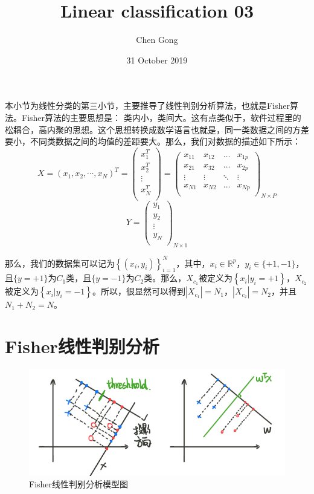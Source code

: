 \documentclass[a4paper]{article}
\title{Linear classification 03}
\author{Chen Gong}
\date{31 October 2019}
\begin{document}
\maketitle
本小节为线性分类的第三小节，主要推导了线性判别分析算法，也就是Fisher算法。Fisher算法的主要思想是：{\color{red} 类内小，类间大。}这有点类似于，软件过程里的松耦合，高内聚的思想。这个思想转换成数学语言也就是，同一类数据之间的方差要小，不同类数据之间的均值的差距要大。那么，我们对数据的描述如下所示：
\begin{equation}
    X=(x_1, x_2, \cdots, x_N)^T=
    \begin{pmatrix}
    x_1^T \\ 
    x_2^T \\
    \vdots\\
    x_N^T \\
    \end{pmatrix} =
    \begin{pmatrix}
    x_{11} & x_{12} & \dots & x_{1p}\\
    x_{21} & x_{32} & \dots & x_{2p}\\
    \vdots & \vdots & \ddots & \vdots\\
    x_{N1} & x_{N2} & \dots & x_{Np}\\
    \end{pmatrix}_{N\times P}
\end{equation}
\begin{equation}
    Y=
    \begin{pmatrix}
    y_1 \\ 
    y_2 \\
    \vdots\\
    y_N \\
    \end{pmatrix}_{N\times 1}
\end{equation}

那么，我们的数据集可以记为$\left\{ (x_i,y_i) \right\}_{i=1}^N$，其中，$x_i \in \mathbb{R}^p$，$y_i\in\{+1,-1\}$，且$\{y=+1\}$为$C_1$类，且$\{y=-1\}$为$C_2$类。那么，$X_{c_1}$被定义为$\left\{ x_i|y_i=+1 \right\}$，$X_{c_2}$被定义为$\left\{ x_i|y_i=-1 \right\}$。所以，很显然可以得到$|X_{c_1}|=N_1$，$|X_{c_2}|=N_2$，并且$N_1+N_2=N$。

\section{Fisher线性判别分析}
\begin{figure}[H]
    \centering
    \includegraphics[width=.55\textwidth]{微信图片_20191031095624.png}
    \caption{Fisher线性判别分析模型图}
    \label{fig:my_label_1}
\end{figure}
\end{document}
